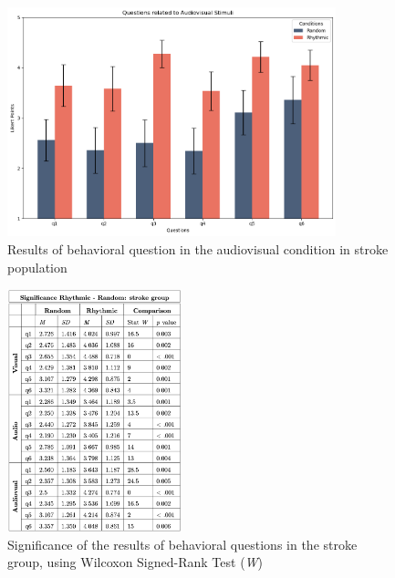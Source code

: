\begin{figure}[H]
    \centering
    \includegraphics[width=0.85\textwidth]{bar_plots/plotbar_audiovisual_s.png}
    \caption{Results of behavioral question in the audiovisual condition in stroke population}
    \label{fig: bar_audiovisual_stroke} 
\end{figure} 
\begin{figure}[H]
    \centering
    \includegraphics[width=0.45\textwidth]{significance_tables/stroke_group.png}
    \caption{Significance of the results of behavioral questions in the stroke group, using Wilcoxon Signed-Rank Test (\textit{W})}
    \label{fig: significance_stroke_pop} 
\end{figure} 

\clearpage
